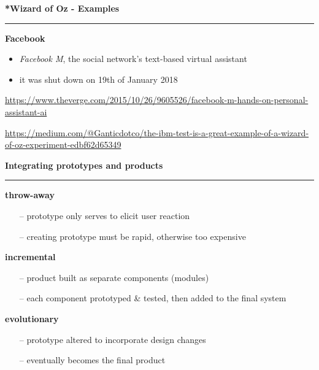 \documentclass[pdf]{beamer}
\begin{document}
\begin{frame}
\vspace{8mm}
\textcolor{myBlue}{\textbf{\Large{*Wizard of Oz - Examples}}}

\textcolor{red}{\rule{10cm}{1mm}}

\bigskip
{\Large \textbf{Facebook}}

\begin{itemize}
\item \textit{Facebook M}, the social network’s text-based virtual assistant
\item it was shut down on 19th of January 2018
\newline
\end{itemize}

\url{https://www.theverge.com/2015/10/26/9605526/facebook-m-hands-on-personal-assistant-ai}
\newline

\url{https://medium.com/@Ganticdotco/the-ibm-test-is-a-great-example-of-a-wizard-of-oz-experiment-edbf62d65349}
\end{frame}



\begin{frame}
\vspace{8mm}
\textcolor{myBlue}{\textbf{\Large{Integrating prototypes and products}}}

\textcolor{red}{\rule{10cm}{1mm}}

\textbf{throw-away}
\begin{itemize}
\item [--]prototype only serves to elicit user reaction
\item[--]creating prototype must be rapid, otherwise too expensive
\end{itemize}

\textbf{incremental}
\begin{itemize}
\item [--]product built as separate components (modules)
\item[--]each component prototyped \& tested, then added to the final system
\end{itemize}

\textbf{evolutionary}
\begin{itemize}
\item [--]prototype altered to incorporate design changes
\item[--]eventually becomes the final product
\end{itemize}

\end{frame}
\end{document}
